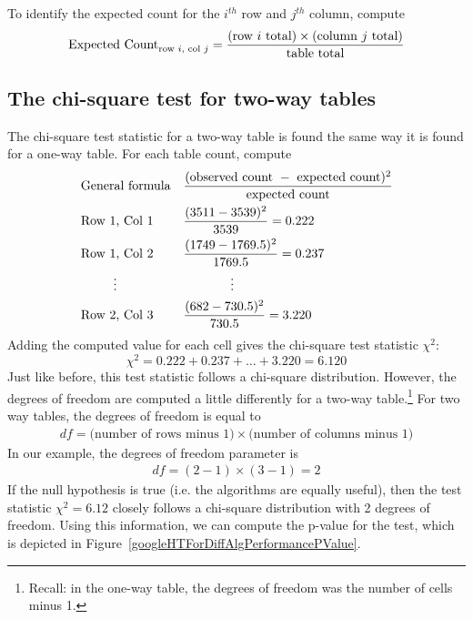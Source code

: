 \begin{termBox}{
To identify the expected count for the $i^{th}$ row and $j^{th}$ column, compute
$$\text{Expected Count}_{\text{row }i,\text{ col }j} = \frac{(\text{row $i$ total}) \times  (\text{column $j$ total})}{\text{table total}}\vspace{2mm}$$}
\end{termBox}


\subsection{The chi-square test for two-way tables}

The chi-square test statistic for a two-way table is found the same way it is found for a one-way table. For each table count, compute
\begin{align*}
&\text{General formula}& &\frac{(\text{observed count } - \text{ expected count})^2}{\text{expected count}} \\
&\text{Row 1, Col 1}& &\frac{(3511 - 3539)^2}{3539} = 0.222 \\
&\text{Row 1, Col 2}& &\frac{(1749 - 1769.5)^2}{1769.5} = 0.237 \\
& \hspace{9mm}\vdots & &\hspace{13mm}\vdots \\
&\text{Row 2, Col 3}& &\frac{(682 - 730.5)^2}{730.5} = 3.220
\end{align*}
Adding the computed value for each cell gives the chi-square test statistic $\chi^2$:
$$\chi^2 = 0.222 + 0.237 + \dots + 3.220 = 6.120$$
Just like before, this test statistic follows a chi-square distribution. However, the degrees of freedom are computed a little differently for a two-way table.\footnote{Recall: in the one-way table, the degrees of freedom was the number of cells minus 1.} For two way tables, the degrees of freedom is equal to
\begin{align*}
df = \text{(number of rows minus 1)}\times \text{(number of columns minus 1)}
\end{align*}
In our example, the degrees of freedom parameter is
\begin{align*}
df = (2-1)\times (3-1) = 2
\end{align*}
If the null hypothesis is true (i.e. the algorithms are equally useful), then the test statistic $\chi^2 = 6.12$ closely follows a chi-square distribution with 2 degrees of freedom. Using this information, we can compute the p-value for the test, which is depicted in Figure~\ref{googleHTForDiffAlgPerformancePValue}.


